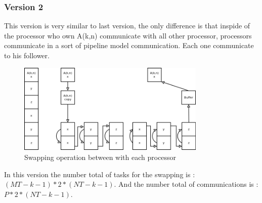 \documentclass{report}
\begin{document}
\subsubsection*{Version 2}
This version is very similar to last version, the only difference is that inspide of the processor who own A(k,n) communicate with all other processor, processors communicate in a sort of pipeline model communication. Each one communicate to his follower.
\begin{figure}[!ht]
\begin{center}
\includegraphics[width=0.8\textwidth]{version2.png} 
\end{center}
\caption{Swapping operation between with each processor}
\end{figure}
In this version the number total of tasks for the swapping is : $(MT-k-1)*2*(NT-k-1)$.
And the number total of communications is : $P*2*(NT-k-1)$.



\end{document}
